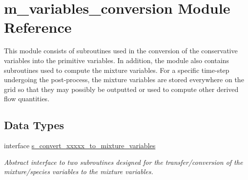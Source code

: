 \hypertarget{namespacem__variables__conversion}{}\section{m\+\_\+variables\+\_\+conversion Module Reference}
\label{namespacem__variables__conversion}


This module consists of subroutines used in the conversion of the conservative variables into the primitive variables. In addition, the module also contains subroutines used to compute the mixture variables. For a specific time-\/step undergoing the post-\/process, the mixture variables are stored everywhere on the grid so that they may possibly be outputted or used to compute other derived flow quantities.  


\subsection*{Data Types}
\begin{DoxyCompactItemize}
\item 
interface \hyperlink{interfacem__variables__conversion_1_1s__convert__xxxxx__to__mixture__variables}{s\+\_\+convert\+\_\+xxxxx\+\_\+to\+\_\+mixture\+\_\+variables}
\begin{DoxyCompactList}\small\item\em Abstract interface to two subroutines designed for the transfer/conversion of the mixture/species variables to the mixture variables. \end{DoxyCompactList}\end{DoxyCompactItemize}
